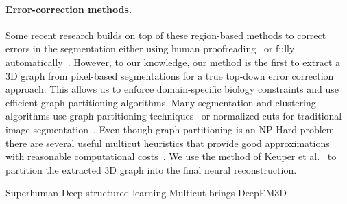 \paragraph{Error-correction methods.}
Some recent research builds on top of these region-based methods to correct errors in the segmentation either using human proofreading~\cite{haehn2017guided,haehn2014design,mojo2} or fully automatically~\cite{rolnick2017morphological,error_correction_using_CNN}.
However, to our knowledge, our method is the first to extract a 3D graph from pixel-based segmentations for a true top-down error correction approach. This allows us to enforce domain-specific biology constraints and use efficient graph partitioning algorithms. Many segmentation and clustering algorithms use graph partitioning techniques~\cite{andres2012globally} or normalized cuts for traditional image segmentation~\cite{kappes2016higher,shi2000normalized,tatiraju2008image}.
Even though graph partitioning is an NP-Hard problem~\cite{demaine2006correlation} there are several useful multicut heuristics that provide good approximations with reasonable computational costs~\cite{horvnakova2017analysis}. We use the method of Keuper et al.~\cite{keuper2015efficient} to partition the extracted 3D graph into the final neural reconstruction.


Superhuman \cite{lee2017superhuman}
Deep structured learning \cite{funke2017deep}
Multicut brings \cite{beier2017multicut}
DeepEM3D \cite{zeng2017deepem3d}